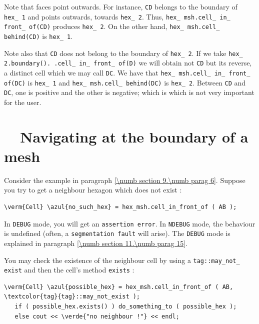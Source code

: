 Note that faces point outwards.
For instance, {\small\tt CD} belongs to the boundary of {\small\tt hex\_\,1} and points
outwards, towards {\small\tt hex\_\,2}.
Thus, {\small\tt hex\_\,msh.cell\_\,in\_\,front\_\,of(CD)} produces {\small\tt hex\_\,2}.
On the other hand, {\small\tt hex\_\,msh.cell\_\,behind(CD)} is {\small\tt hex\_\,1}.

Note also that {\small\tt CD} does not belong to the boundary of {\small\tt hex\_\,2}.
If we take {\small\tt hex\_\,2.boundary(). .cell\_\,in\_\,front\_\,of(D)} we will obtain not
{\small\tt CD} but its reverse, a distinct cell which we may call {\small\tt DC}.
We have that {\small\tt hex\_\,msh.cell\_\,in\_\,front\_\,of(DC)} is {\small\tt hex\_\,1} and
{\small\tt hex\_\,msh.cell\_\,behind(DC)} is {\small\tt hex\_\,2}.
Between {\small\tt CD} and {\small\tt DC}, one is positive and the other is negative;
which is which is not very important for the user.


\section{~~Navigating at the boundary of a mesh}\label{\numb section 9.\numb parag 7}

Consider the example in paragraph \ref{\numb section 9.\numb parag 6}.
Suppose you try to get a neighbour hexagon which does not exist :

\begin{Verbatim}[commandchars=\\\{\},formatcom=\small\tt,
   baselinestretch=0.94,framesep=2mm                      ]
   \verm{Cell} \azul{no_such_hex} = hex_msh.cell_in_front_of ( AB );
\end{Verbatim}

In {\small\tt DEBUG} mode, you will get an {\small\tt assertion error}.
In {\small\tt NDEBUG} mode, the behaviour is undefined
(often, a {\small\tt segmentation fault} will arise).
The {\small\tt DEBUG} mode is explained in paragraph \ref{\numb section 11.\numb parag 15}.

You may check the existence of the neighbour cell by using a
{\small\tt \textcolor{tag}{tag}::may\_\;not\_\,exist} and then the cell's method {\small\tt exists} :

\begin{Verbatim}[commandchars=\\\{\},formatcom=\small\tt,
   baselinestretch=0.94,framesep=2mm                      ]
   \verm{Cell} \azul{possible_hex} = hex_msh.cell_in_front_of ( AB, \textcolor{tag}{tag}::may_not_exist );
   if ( possible_hex.exists() ) do_something_to ( possible_hex );
   else cout << \verde{"no neighbour !"} << endl;
\end{Verbatim}

